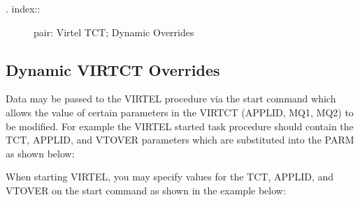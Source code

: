 \documentclass[letterpaper,10pt,english]{sphinxmanual}
\begin{document}
\begin{description}
\item[{. index::}] \leavevmode
pair: Virtel TCT; Dynamic Overrides

\end{description}


\subsection{Dynamic VIRTCT Overrides}
\label{\detokenize{Installation_Guide:dynamic-virtct-overrides}}
Data may be passed to the VIRTEL procedure via the start command which allows the value of certain parameters in the VIRTCT (APPLID, MQ1, MQ2) to be modified. For example the VIRTEL started task procedure should contain the TCT, APPLID, and VTOVER parameters which are substituted into the PARM as shown below:

\begin{sphinxVerbatim}[commandchars=\\\{\}]
  
 
 
\end{sphinxVerbatim}

When starting VIRTEL, you may specify values for the TCT, APPLID, and VTOVER on the start command as shown in the example below:

\begin{sphinxVerbatim}[commandchars=\\\{\}]
 
\end{sphinxVerbatim}
\end{document}
